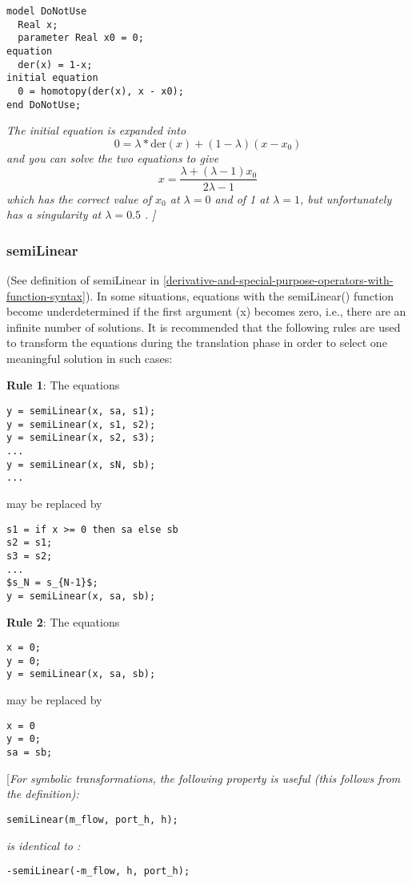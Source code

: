 \begin{lstlisting}[language=modelica]
model DoNotUse
  Real x;
  parameter Real x0 = 0;
equation
  der(x) = 1-x;
initial equation
  0 = homotopy(der(x), x - x0);
end DoNotUse;
\end{lstlisting}

\emph{The initial equation is expanded into}
$$ 0 = \lambda*\mathrm{der}(x)+(1-\lambda)(x-x_0)$$
\emph{and you can solve the two equations to give}
$$ x=\frac{\lambda+(\lambda-1)x_0}{2\lambda-1}$$
\emph{which has the correct value of $x_0$ at $\lambda = 0$ and of 1 at $\lambda= 1$, but unfortunately has a singularity at $\lambda = 0.5 $ .}
\emph{{]}}

\subsubsection{semiLinear}

(See definition of semiLinear in \autoref{derivative-and-special-purpose-operators-with-function-syntax}). In some situations,
equations with the semiLinear() function become underdetermined if the
first argument (x) becomes zero, i.e., there are an infinite number of
solutions. It is recommended that the following rules are used to
transform the equations during the translation phase in order to select
one meaningful solution in such cases:

\textbf{Rule 1}: The equations

\begin{lstlisting}[language=modelica]
y = semiLinear(x, sa, s1);
y = semiLinear(x, s1, s2);
y = semiLinear(x, s2, s3);
...
y = semiLinear(x, sN, sb);
...
\end{lstlisting}

may be replaced by
\begin{lstlisting}[language=modelica, mathescape=true]
s1 = if x >= 0 then sa else sb
s2 = s1;
s3 = s2;
...
$s_N = s_{N-1}$;
y = semiLinear(x, sa, sb);
\end{lstlisting}

\textbf{Rule 2}: The equations
\begin{lstlisting}[language=modelica]
x = 0;
y = 0;
y = semiLinear(x, sa, sb);
\end{lstlisting}

may be replaced by
\begin{lstlisting}[language=modelica]
x = 0
y = 0;
sa = sb;
\end{lstlisting}

{[}\emph{For symbolic transformations, the following property is useful
(this follows from the definition):}
\begin{lstlisting}[language=modelica]
semiLinear(m_flow, port_h, h);
\end{lstlisting}
\emph{is identical to :}
\begin{lstlisting}[language=modelica]
-semiLinear(-m_flow, h, port_h);
\end{lstlisting}

